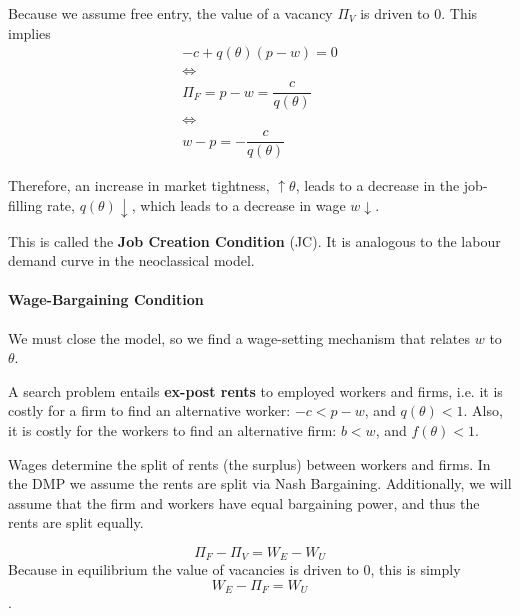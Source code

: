 \documentclass[11pt]{article}
\begin{document}
Because we assume free entry, the value of a vacancy $\Pi_V$ is driven to 0. This implies 
\begin{gather*}
    -c + q(\theta)(p-w) = 0 \\
    \Leftrightarrow \\
    \Pi_F = p-w=\dfrac{c}{q(\theta)} \\
    \Leftrightarrow \\
    w-p = -\dfrac{c}{q(\theta)}
\end{gather*}

Therefore, an increase in market tightness, $\uparrow\theta$, leads to a decrease in the job-filling rate, $q(\theta)\downarrow$, which leads to a decrease in wage $w \downarrow$.

This is called the \textbf{Job Creation Condition} (JC). It is analogous to the labour demand curve in the neoclassical model.


\paragraph{Wage-Bargaining Condition}

We must close the model, so we find a wage-setting mechanism that relates $w$ to $\theta$.

\begin{note}
    A search problem entails \textbf{ex-post rents} to employed workers and firms, i.e. it is costly for a firm to find an alternative worker: $-c<p-w$, and $q(\theta)<1$. Also, it is costly for the workers to find an alternative firm: $b<w$, and $f(\theta)<1$.
\end{note}

Wages determine the split of rents (the surplus) between workers and firms. In the DMP we assume the rents are split via Nash Bargaining. Additionally, we will assume that the firm and workers have equal bargaining power, and thus the rents are split equally.

\[\Pi_F - \Pi_V = W_E - W_U\]
Because in equilibrium the value of vacancies is driven to 0, this is simply
\[W_E - \Pi_F = W_U\].
\end{document}

